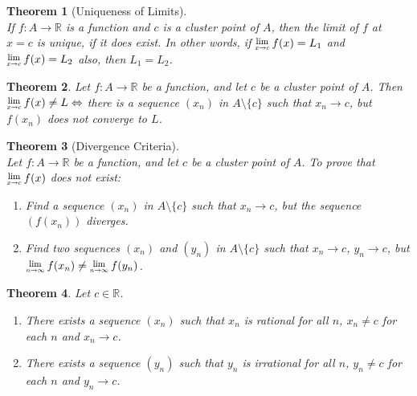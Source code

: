\documentclass[12pt]{article}
\newcommand{\Lim}[1]{\raisebox{0.5ex}{\scalebox{0.8}{$\displaystyle \lim_{#1}\;$}}}
\newtheorem{theorem}{Theorem}[section]
\theoremstyle{definition}
\begin{document}
\begin{theorem}[Uniqueness of Limits]
\hfill\\\normalfont If $f:A\to\mathbb{R}$ is a function and $c$ is a cluster point of $A$, then the limit of $f$ at $x=c$ is unique, if it does exist. In other words, if $\Lim{x\to c}f(x)=L_1$ and $\Lim{x\to c}f(x)=L_2$ also, then $L_1 = L_2$.
\end{theorem}
\begin{theorem}\normalfont Let $f:A\to\mathbb{R}$ be a function, and let $c$ be a cluster point of $A$. Then $\Lim{x\to c}f(x)\neq L\Leftrightarrow$ there is a sequence $(x_n)$ in $A\setminus\{c\}$ such that $x_n\to c$, but $f(x_n)$ does not converge to $L$.
\end{theorem}
\begin{theorem}[Divergence Criteria]
\hfill\\\normalfont Let $f:A\to\mathbb{R}$ be a function, and let $c$ be a cluster point of $A$. To prove that $\Lim{x\to c}f(x)$ does not exist:
\begin{enumerate}[label = Method \arabic*]
\item Find a sequence $(x_n)$ in $A\setminus\{c\}$ such that $x_n\to c$, but the sequence $(f(x_n))$ diverges.
\item Find two sequences $(x_n)$ and $(y_n)$ in $A\setminus\{c\}$ such that $x_n\to c$, $y_n\to c$, but $\Lim{n\to\infty}f(x_n)\neq \Lim{n\to\infty} f(y_n)$.
\end{enumerate}
\end{theorem}
\begin{theorem}\normalfont Let $c\in\mathbb{R}$.
\begin{enumerate}
\item There exists a sequence $(x_n)$ such that $x_n$ is rational for all $n$, $x_n\neq c$ for each $n$ and $x_n\to c$.
\item There exists a sequence $(y_n)$ such that $y_n$ is irrational for all $n$, $y_n\neq c$ for each $n$ and $y_n\to c$.
\end{enumerate}
\end{theorem}
\end{document}

